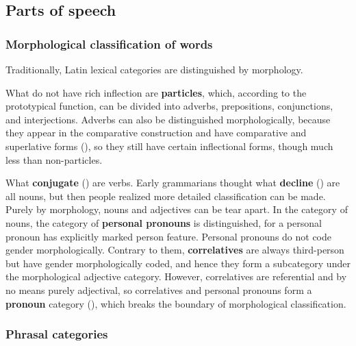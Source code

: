 \documentclass{article}
\newcommand*{\concept}[1]{\textbf{#1}}
\begin{document}
\subsection{Parts of speech}


\subsubsection{Morphological classification of words}

Traditionally, Latin lexical categories are distinguished by morphology.

What do not have rich inflection are \concept{particles},
which, according to the prototypical function,
can be divided into adverbs, prepositions, conjunctions, and interjections.
Adverbs can also be distinguished morphologically,
because they appear in the comparative construction and have comparative and superlative forms 
(),
so they still have certain inflectional forms, though much less than non-particles.

What \concept{conjugate} () are verbs.
Early grammarians thought what \concept{decline} ()
are all nouns,
but then people realized more detailed classification can be made.
Purely by morphology, nouns and adjectives can be tear apart.
In the category of nouns, the category of \concept{personal pronouns} is distinguished,
for a personal pronoun has explicitly marked person feature.
Personal pronouns do not code gender morphologically.
Contrary to them, \concept{correlatives} are always third-person but have gender morphologically coded,
and hence they form a subcategory under the morphological adjective category.
However, correlatives are referential and by no means purely adjectival,
so correlatives and personal pronouns form a \concept{pronoun} category (),
which breaks the boundary of morphological classification.

\subsubsection{Phrasal categories}
\end{document}

